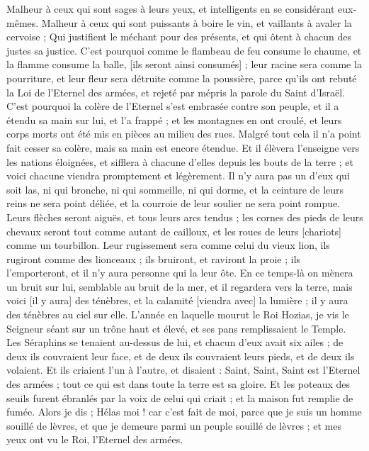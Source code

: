 \begin{multicols}{2}
Malheur à ceux qui sont sages à leurs yeux, et intelligents en se considérant eux-mêmes.
Malheur à ceux qui sont puissants à boire le vin, et vaillants à avaler la cervoise ;
Qui justifient le méchant pour des présents, et qui ôtent à chacun des justes sa justice.
C'est pourquoi comme le flambeau de feu consume le chaume, et la flamme consume la balle, [ils seront ainsi consumés] ; leur racine sera comme la pourriture, et leur fleur sera détruite comme la poussière, parce qu'ils ont rebuté la Loi de l'Eternel des armées, et rejeté par mépris la parole du Saint d'Israël.
C'est pourquoi la colère de l'Eternel s'est embrasée contre son peuple, et il a étendu sa main sur lui, et l'a frappé ; et les montagnes en ont croulé, et leurs corps morts ont été mis en pièces au milieu des rues. Malgré tout cela il n'a point fait cesser sa colère, mais sa main est encore étendue.
Et il élèvera l'enseigne vers les nations éloignées, et sifflera à chacune d'elles depuis les bouts de la terre ; et voici chacune viendra promptement et légèrement.
Il n'y aura pas un d'eux qui soit las, ni qui bronche, ni qui sommeille, ni qui dorme, et la ceinture de leurs reins ne sera point déliée, et la courroie de leur soulier ne sera point rompue.
Leurs flèches seront aiguës, et tous leurs arcs tendus ; les cornes des pieds de leurs chevaux seront tout comme autant de cailloux, et les roues de leurs [chariots] comme un tourbillon.
Leur rugissement sera comme celui du vieux lion, ils rugiront comme des lionceaux ; ils bruiront, et raviront la proie ; ils l'emporteront, et il n'y aura personne qui la leur ôte.
En ce temps-là on mènera un bruit sur lui, semblable au bruit de la mer, et il regardera vers la terre, mais voici [il y aura] des ténèbres, et la calamité [viendra avec] la lumière ; il y aura des ténèbres au ciel sur elle.
\VerseOne{}L'année en laquelle mourut le Roi Hozias, je vis le Seigneur séant sur un trône haut et élevé, et ses pans remplissaient le Temple.
Les Séraphins se tenaient au-dessus de lui, et chacun d'eux avait six ailes ; de deux ils couvraient leur face, et de deux ils couvraient leurs pieds, et de deux ils volaient.
Et ils criaient l'un à l'autre, et disaient : Saint, Saint, Saint est l'Eternel des armées ; tout ce qui est dans toute la terre est sa gloire.
Et les poteaux des seuils furent ébranlés par la voix de celui qui criait ; et la maison fut remplie de fumée.
Alors je dis ; Hélas moi ! car c'est fait de moi, parce que je suis un homme souillé de lèvres, et que je demeure parmi un peuple souillé de lèvres ; et mes yeux ont vu le Roi, l'Eternel des armées.

\end{multicols}
